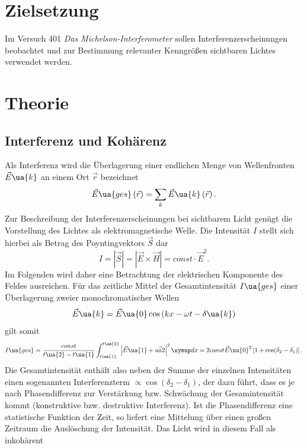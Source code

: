 \setcounter{page}{1}
\section*{Zielsetzung}
Im Versuch 401 \emph{Das Michelson-Interferometer} sollen Interferenzerscheinungen beobachtet und zur Bestimmung
relevanter Kenngrößen sichtbaren Lichtes verwendet werden.
\section{Theorie}
\subsection{Interferenz und Kohärenz}
Als Interferenz wird die Überlagerung einer endlichen Menge von Wellenfronten $\vec{E}\ua{k}$ an einem Ort $\vec{r}$ bezeichnet
\begin{equation}
  \vec{E}\ua{ges}\left(\vec{r}\right) = \sum_k \vec{E}\ua{k}\left(\vec{r}\right).
\end{equation}
Zur Beschreibung der Interferenzerscheinungen bei sichtbarem Licht genügt die Vorstellung des Lichtes als elektromagnetische
Welle. Die Intensität $I$ stellt sich hierbei als Betrag des Poyntingvektors $\vec{S}$ dar
\begin{equation}
  I = \left|\vec{S}\right| = \left| \vec{E} \times \vec{H}\right| = const \cdot \vec{E}^2.
\end{equation}
Im Folgenden wird daher eine Betrachtung der elektrischen Komponente des Feldes ausreichen.
Für das zeitliche Mittel der Gesamtintensität $I\ua{ges}$ einer Überlagerung zweier monochromatischer Wellen
\begin{equation}
  \vec{E}\ua{k} = \vec{E}\ua{0}\cos\left(kx - \omega t - \delta\ua{k} \right)
\end{equation}
gilt somit
\begin{equation}
  I\ua{ges} = \frac{const}{t\ua{2}- t\ua{1}}\int_{t\ua{1}}^{t\ua{2}}\left| \vec{E}\ua{1} + \vec{ua{2}} \right|^2 \dif{x} = 2const\vec{E}\ua{0}^2\left[1 + \cos(\delta_2- \delta_1)\right].
\end{equation}
Die Gesamtintensität enthält also neben der Summe der einzelnen Intensitäten einen sogenannten Interferenzterm $\propto \cos(\delta_2-\delta_1)$, der dazu führt, dass
es je nach Phasendifferenz zur Verstärkung bzw. Schwächung der Gesamintensität kommt (konstruktive bzw. destruktive Interferenz). Ist die Phasendifferenz eine
statistische Funktion der Zeit, so liefert eine Mittelung über einen großen Zeitraum die Auslöschung der Intensität. Das Licht wird in diesem Fall als inkohärent
